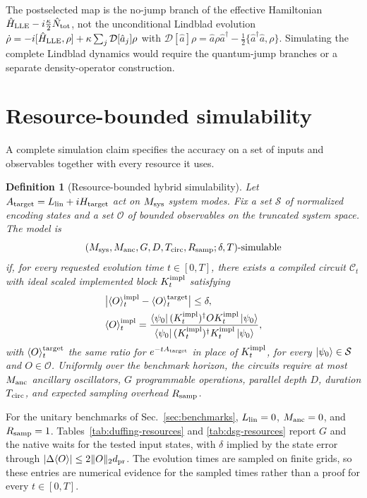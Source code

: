 \documentclass[pra,twocolumn,superscriptaddress,nofootinbib,floatfix]{revtex4-2}
\newtheorem{definition}{Definition}
\theoremstyle{remark}
\newcommand{\dpr}{d_{\rm pr}}
\newcommand{\revcolor}{\color{blue}}
\DeclareRobustCommand{\rev}[1]{{\revcolor #1}}
\begin{document}
\rev{The postselected map is the no-jump branch of the effective Hamiltonian \(\hat H_{\rm LLE}-i\tfrac{\kappa}{2}\hat N_{\rm tot}\), not the unconditional Lindblad evolution \(\dot\rho=-i[\hat H_{\rm LLE},\rho]+\kappa\sum_j\mathcal D[\hat a_j]\rho\) with \(\mathcal D[\hat a]\rho=\hat a\rho\hat a^\dagger-\tfrac12\{\hat a^\dagger\hat a,\rho\}\).} \rev{Simulating the complete Lindblad dynamics would require the quantum-jump branches or a separate density-operator construction.}

\section{Resource-bounded simulability}
\label{app:simulability}

\rev{A complete simulation claim specifies the accuracy on a set of inputs and observables together with every resource it uses.}

\begin{definition}[Resource-bounded hybrid simulability]
\label{def:simulability}
Let \(A_{\rm target}=L_{\rm lin}+iH_{\rm target}\) act on \(M_{\rm sys}\) system modes. \rev{Fix a set \(\mathcal S\) of normalized encoding states and a set \(\mathcal O\) of bounded observables on the truncated system space.} The model is
\[
(M_{\rm sys},M_{\rm anc},G,D,T_{\rm circ},R_{\rm samp};\delta,T)\text{-simulable}
\]
if, for every requested evolution time \(t\in[0,T]\), there exists a compiled circuit \(\mathcal C_t\) with ideal scaled implemented block \(K_t^{\rm impl}\) satisfying
\begingroup\revcolor
\begin{align}
&\bigl|\langle O\rangle_t^{\rm impl}-\langle O\rangle_t^{\rm target}\bigr|\leq\delta,\nonumber\\
&\langle O\rangle_t^{\rm impl}=\frac{\bra{\psi_0}(K_t^{\rm impl})^\dagger O K_t^{\rm impl}\ket{\psi_0}}{\bra{\psi_0}(K_t^{\rm impl})^\dagger K_t^{\rm impl}\ket{\psi_0}},
\end{align}
\endgroup
\rev{with \(\langle O\rangle_t^{\rm target}\) the same ratio for \(e^{-tA_{\rm target}}\) in place of \(K_t^{\rm impl}\), for every \(\ket{\psi_0}\in\mathcal S\) and \(O\in\mathcal O\).} Uniformly over the benchmark horizon, the circuits require at most \(M_{\rm anc}\) ancillary oscillators, \(G\) programmable operations, parallel depth \(D\), duration \(T_{\rm circ}\), and expected sampling overhead \(R_{\rm samp}\).
\end{definition}

\rev{For the unitary benchmarks of Sec.~\ref{sec:benchmarks}, \(L_{\rm lin}=0\), \(M_{\rm anc}=0\), and \(R_{\rm samp}=1\).} \rev{Tables~\ref{tab:duffing-resources} and \ref{tab:dsg-resources} report \(G\) and the native waits for the tested input states, with \(\delta\) implied by the state error through \(|\Delta\langle O\rangle|\le2\|O\|_2\dpr\).} \rev{The evolution times are sampled on finite grids, so these entries are numerical evidence for the sampled times rather than a proof for every \(t\in[0,T]\).}
\end{document}
